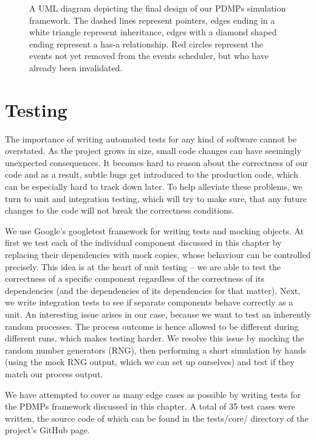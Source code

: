 \documentclass[report.tex]{subfiles}
\begin{document}
\begin{figure}
  \centering
  \def\svgwidth{.95\linewidth}
  
  \caption{A UML diagram depicting the final design of our PDMPs simulation framework.
           The dashed lines represent pointers, edges ending in a white triangle
           represent inheritance, edges with a diamond shaped ending represent a
           has-a relationship. Red circles represent the events not yet removed
           from the events scheduler, but who have already been invalidated.}
  \label{image-uml-diagram-dependencies-graph-based-design}
\end{figure}

\section{Testing}

The importance of writing automated tests for any kind of software cannot be overstated.
As the project grows in size, small code changes can have seemingly unexpected consequences.
It becomes hard to reason about the correctness of our code and as a result,
subtle bugs get introduced to the production code, which can be especially hard to
track down later. To help alleviate these problems, we turn to unit and integration testing,
which will try to make sure, that any future changes to the code will not break the
correctness conditions.

We use Google's googletest \cite{googletest-library}
framework for writing tests and mocking objects.
At first we test each of the individual component discussed in this chapter by
replacing their dependencies with mock copies, whose behaviour can be controlled precisely.
This idea is at the heart of unit testing -- we are able to test the correctness of a
specific component regardless of the correctness of its dependencies
(and the dependencies of its dependencies for that matter).
Next, we write integration tests to see if separate components behave correctly as a unit.
An interesting issue arises in our case, because we want to test an inherently random
processes. The process outcome is hence allowed to be different during different
runs, which makes testing harder.
We resolve this issue by mocking the random number generators (RNG), then performing
a short simulation by hands (using the mock RNG output, which we can set up ourselves)
and test if they match our process output.

We have attempted to cover as many edge cases as possible by writing tests
for the PDMPs framework discussed in this chapter. A total of 35 test cases were
written, the source code of which can be found in the tests/core/ directory of the
project's GitHub page.
\end{document}
